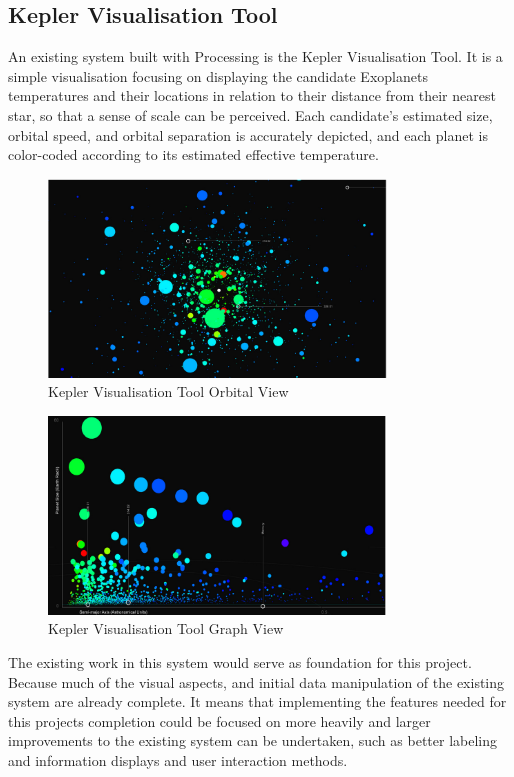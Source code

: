 \subsection{Kepler Visualisation Tool}
An existing system built with Processing is the Kepler Visualisation Tool\cite{kepler_github, kepler_article}. It is a simple visualisation focusing on displaying the candidate Exoplanets temperatures and their locations in relation to their distance from their nearest star, so that a sense of scale can be perceived. Each candidate’s estimated size, orbital speed, and orbital separation is accurately depicted, and each planet is color-coded according to its estimated effective temperature.
\begin{figure}[h!]
  \centering
      \includegraphics[width=0.8\textwidth]{images/kepler_orbital.jpg}
  \caption{Kepler Visualisation Tool Orbital View}
\end{figure}
\begin{figure}[h!]
  \centering
      \includegraphics[width=0.8\textwidth]{images/kepler_graph.jpg}
  \caption{Kepler Visualisation Tool Graph View}
\end{figure}
The existing work in this system would serve as foundation for this project. Because much of the visual aspects, and initial data manipulation of the existing system are already complete. It means that implementing the features needed for this projects completion could be focused on more heavily and larger improvements to the existing system can be undertaken, such as better labeling and information displays and user interaction methods.
